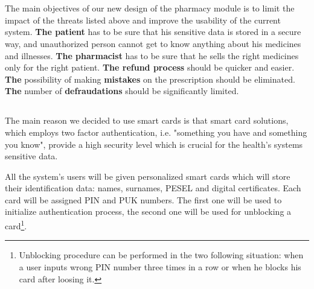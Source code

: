 \chapter{}


\section{}

The main objectives of our new design of the pharmacy module is to limit the impact of the threats listed above and improve the usability of the current system.
\newline
\textbf{ The patient} has to be sure that his sensitive data is stored in a secure way, and unauthorized person cannot get to know anything about his medicines and illnesses. 
\newline
\textbf{The pharmacist} has to be sure that he sells the right medicines only for the right patient. 
\newline
\textbf{The refund process} should be quicker and easier. 
\newline
\textbf{The} possibility of making \textbf{mistakes} on the prescription should be eliminated. 
\newline
\textbf{The} number of \textbf{defraudations} should be significantly limited.


\section{}

\subsection{}

The main reason we decided to use smart cards is that smart card solutions, which employs two factor authentication, i.e. "something you have and something you know", provide a high security level which is crucial for the health's systems sensitive data.

All the system's users will be given personalized smart cards which will store their identification data: names, surnames, PESEL and digital certificates. Each card will be assigned PIN and PUK numbers. The first one will be used to initialize authentication process, the second one will be used for unblocking a card\footnote{Unblocking procedure can be performed in the two following situation: when a user inputs wrong PIN number three times in a row or when he blocks his card after loosing it.}. 

